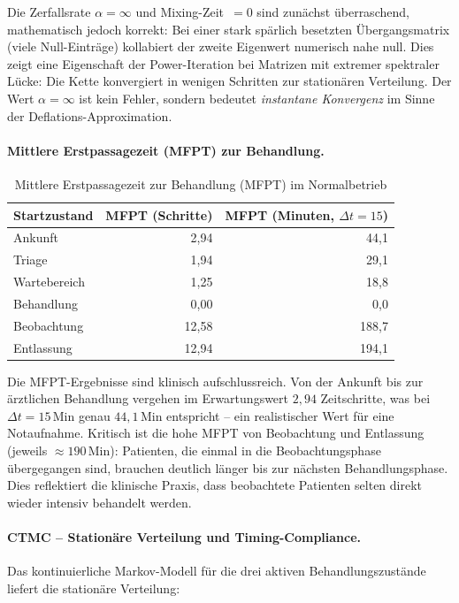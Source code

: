 ﻿\documentclass[a4paper,12pt]{scrreprt}
\theoremstyle{definition}
\begin{document}
Die Zerfallsrate $\alpha = \infty$ und Mixing-Zeit~$= 0$ sind zunächst
überraschend, mathematisch jedoch korrekt: Bei einer stark spärlich besetzten
Übergangsmatrix (viele Null-Einträge) kollabiert der zweite Eigenwert
numerisch nahe null. Dies zeigt eine Eigenschaft der Power-Iteration bei
Matrizen mit extremer spektraler Lücke: Die Kette konvergiert in wenigen
Schritten zur stationären Verteilung. Der Wert
$\alpha = \infty$ ist kein Fehler, sondern bedeutet \emph{instantane
	Konvergenz} im Sinne der Deflations-Approximation.

\paragraph{Mittlere Erstpassagezeit (MFPT) zur Behandlung.}
\begin{table}[H]
	\centering
	\begin{tabular}{@{}lrr@{}}
		\toprule
		\textbf{Startzustand} & \textbf{MFPT (Schritte)} & \textbf{MFPT (Minuten, $\Delta t=15$)} \\
		\midrule
		Ankunft     & 2{,}94 & 44{,}1 \\
		Triage      & 1{,}94 & 29{,}1 \\
		Wartebereich& 1{,}25 & 18{,}8 \\
		Behandlung  & 0{,}00 &  0{,}0 \\
		Beobachtung &12{,}58 &188{,}7 \\
		Entlassung  &12{,}94 &194{,}1 \\
		\bottomrule
	\end{tabular}
	\caption{Mittlere Erstpassagezeit zur Behandlung (MFPT) im Normalbetrieb}
	\label{tab:mfpt-normal}
\end{table}

Die MFPT-Ergebnisse sind klinisch aufschlussreich. Von der Ankunft bis zur
ärztlichen Behandlung vergehen im Erwartungswert $2{,}94$ Zeitschritte,
was bei $\Delta t = 15$\,Min genau $44{,}1$\,Min entspricht -- ein
realistischer Wert für eine Notaufnahme. Kritisch ist die hohe MFPT
von Beobachtung und Entlassung (jeweils $\approx 190$\,Min): Patienten,
die einmal in die Beobachtungsphase übergegangen sind, brauchen
deutlich länger bis zur nächsten Behandlungsphase. Dies reflektiert die
klinische Praxis, dass beobachtete Patienten selten direkt wieder intensiv
behandelt werden.

\paragraph{CTMC -- Stationäre Verteilung und Timing-Compliance.}
Das kontinuierliche Markov-Modell für die drei aktiven Behandlungszustände
liefert die stationäre Verteilung:
\end{document}
